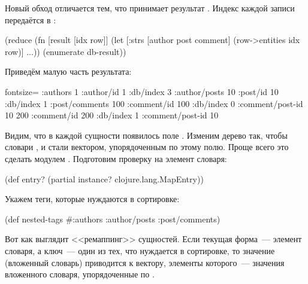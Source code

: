 Новый обход отличается тем, что  принимает результат . Индекс каждой записи передаётся в :

\begin{english}
  \begin{clojure}
(reduce
 (fn [result [idx row]]
   (let [{:strs [author post comment]}
         (row->entities idx row)]
     ...))
 {}
 (enumerate db-result))
  \end{clojure}
\end{english}

Приведём малую часть результата:

\begin{english}
  \begin{clojure*}{fontsize=\small}
{:authors
 {1 {:author/id 1
     :db/index 3
     :author/posts
     {10 {:post/id 10
          :db/index 1
          :post/comments
          {100 {:comment/id 100
                :db/index 0
                :comment/post-id 10}
           200 {:comment/id 200
                :db/index 1
                :comment/post-id 10}}}}}}}
  \end{clojure*}
\end{english}

Видим, что в каждой сущности появилось поле . Изменим дерево так, чтобы словари ,  и  стали вектором, упорядоченным по этому полю. Проще всего это сделать модулем . Подготовим проверку на элемент словаря:

\begin{english}
  \begin{clojure}
(def entry?
  (partial instance? clojure.lang.MapEntry))
  \end{clojure}
\end{english}

Укажем теги, которые нуждаются в сортировке:

\begin{english}
  \begin{clojure}
(def nested-tags
  #{:authors :author/posts :post/comments})
  \end{clojure}
\end{english}

Вот как выглядит <<ремаппинг>> сущностей. Если текущая форма~--- элемент словаря, а ключ~--- один из тех, что нуждается в сортировке, то значение (вложенный словарь) приводится к вектору, элементы которого~--- значения вложенного словаря, упорядоченные по .

